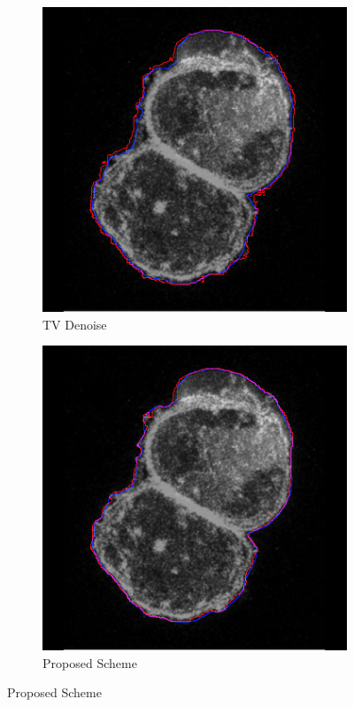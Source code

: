 \documentclass[a4paper,11pt]{ijamas}
\begin{document}
{\begin{figure}
\begin{subfigure}{.25\textwidth}
  \centering
  \includegraphics[width=0.80\columnwidth]{./figs/results/2tv.jpg}
 \caption{TV Denoise}
  \label{fig:tvseg_2}
\end{subfigure}%
\begin{subfigure}{.25\textwidth}
  \centering
  \includegraphics[width=0.80\columnwidth]{./figs/results/2scheme.jpg}
 \caption{Proposed Scheme}
  \label{fig:schemeseg_2}
\end{subfigure}%



\end{figure}}
\end{document}
